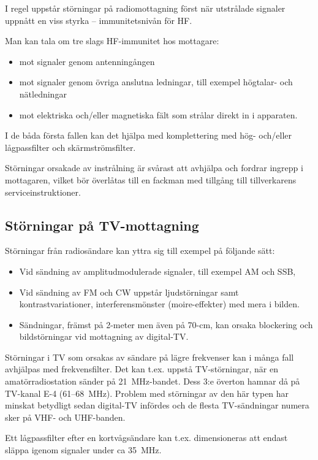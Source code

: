 I regel uppstår störningar på radiomottagning först när utstrålade signaler
uppnått en viss styrka -- immunitetsnivån för HF.

Man kan tala om tre slags HF-immunitet hos mottagare:
\begin{itemize}
\item mot signaler genom antenningången
\item mot signaler genom övriga anslutna ledningar, till exempel högtalar-
  och nätledningar
\item mot elektriska och/eller magnetiska fält som strålar direkt in i
  apparaten.
\end{itemize}

I de båda första fallen kan det hjälpa med komplettering med hög- och/eller
lågpassfilter och skärmströmsfilter.

Störningar orsakade av instrålning är svårast att avhjälpa och fordrar ingrepp i
mottagaren, vilket bör överlåtas till en fackman med tillgång till
tillverkarens serviceinstruktioner.

\subsection{Störningar på TV-mottagning}

Störningar från radiosändare kan yttra sig till exempel på följande sätt:
\begin{itemize}
  uppstår ljudförvrängning i ljudkanalen samt ränder m.m. i bilden,
\item Vid sändning av amplitudmodulerade signaler, till exempel AM och SSB,
\item Vid sändning av FM och CW uppstår ljudstörningar samt
  kontrastvariationer, interferensmönster (moire-effekter) med mera i bilden.
\item Sändningar, främst på 2-meter men även på 70-cm, kan orsaka blockering och
  bildstörningar vid mottagning av digital-TV.
\end{itemize}

Störningar i TV som orsakas av sändare på lägre frekvenser kan i många fall
avhjälpas med frekvensfilter.
Det kan t.ex. uppstå TV-störningar, när en amatörradiostation sänder på
21~MHz-bandet.
Dess 3:e överton hamnar då på TV-kanal E-4 (61--68~MHz).
Problem med störningar av den här typen har minskat betydligt sedan digital-TV
infördes och de flesta TV-sändningar numera sker på VHF- och UHF-banden.

Ett lågpassfilter efter en kortvågsändare kan t.ex. dimensioneras att endast
släppa igenom signaler under ca 35~MHz.

